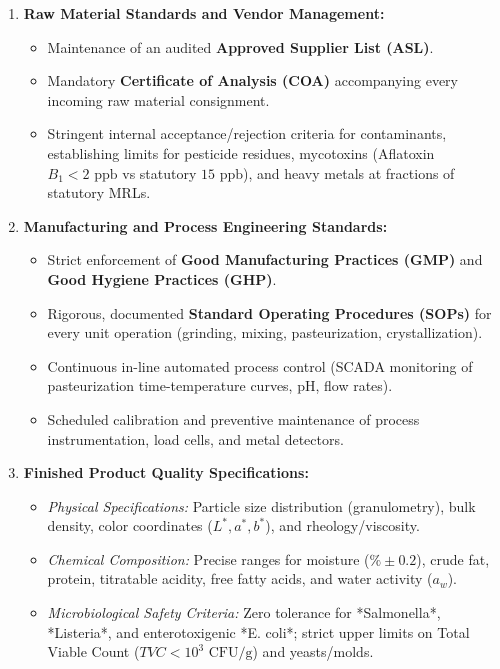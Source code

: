 \documentclass[11pt,a4paper,oneside]{article}
\begin{document}
\begin{enumerate}[leftmargin=*]
    \item \textbf{Raw Material Standards and Vendor Management:}
    \begin{itemize}
        \item Maintenance of an audited \textbf{Approved Supplier List (ASL)}.
        \item Mandatory \textbf{Certificate of Analysis (COA)} accompanying every incoming raw material consignment.
        \item Stringent internal acceptance/rejection criteria for contaminants, establishing limits for pesticide residues, mycotoxins (Aflatoxin $B_1 < 2\text{ ppb}$ vs statutory $15\text{ ppb}$), and heavy metals at fractions of statutory MRLs.
    \end{itemize}
    \item \textbf{Manufacturing and Process Engineering Standards:}
    \begin{itemize}
        \item Strict enforcement of \textbf{Good Manufacturing Practices (GMP)} and \textbf{Good Hygiene Practices (GHP)}.
        \item Rigorous, documented \textbf{Standard Operating Procedures (SOPs)} for every unit operation (grinding, mixing, pasteurization, crystallization).
        \item Continuous in-line automated process control (SCADA monitoring of pasteurization time-temperature curves, pH, flow rates).
        \item Scheduled calibration and preventive maintenance of process instrumentation, load cells, and metal detectors.
    \end{itemize}
    \item \textbf{Finished Product Quality Specifications:}
    \begin{itemize}
        \item \textit{Physical Specifications:} Particle size distribution (granulometry), bulk density, color coordinates ($L^*, a^*, b^*$), and rheology/viscosity.
        \item \textit{Chemical Composition:} Precise ranges for moisture ($\% \pm 0.2$), crude fat, protein, titratable acidity, free fatty acids, and water activity ($a_w$).
        \item \textit{Microbiological Safety Criteria:} Zero tolerance for *Salmonella*, *Listeria*, and enterotoxigenic *E. coli*; strict upper limits on Total Viable Count ($TVC < 10^3\text{ CFU/g}$) and yeasts/molds.

\end{itemize}
\end{enumerate}
\end{document}
